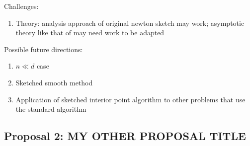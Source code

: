 Challenges:
\begin{enumerate}
\item
Theory: analysis approach of original newton sketch may work; asymptotic theory like that of \citep{Lacotte:2020} may need work to be adapted
\end{enumerate}

Possible future directions:
\begin{enumerate}
\item
$n\ll d$ case
\item
Sketched smooth method
\item
Application of sketched interior point algorithm to other problems that use the standard algorithm
\end{enumerate}


\subsection{Proposal 2: MY OTHER PROPOSAL TITLE} %

